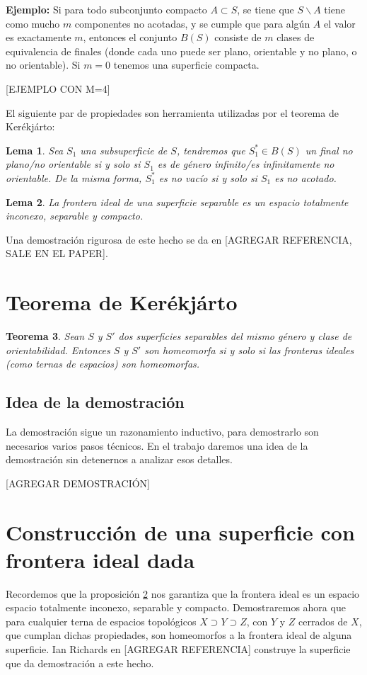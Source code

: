 \documentclass[a4paper,11pt,spanish, twoside, leqno]{tfg-uam}
\newtheorem{teor}{Teorema}[chapter]
\newtheorem{lema}[teor]{Lema}
\theoremstyle{definition}
\begin{document}
\textbf{Ejemplo:} Si para todo subconjunto compacto $A\subset S$, se tiene que $S\backslash A$ tiene como mucho $m$ componentes no acotadas, y se cumple que para algún $A$ el valor es exactamente $m$, entonces el conjunto $B(S)$ consiste de $m$ clases de equivalencia de finales (donde cada uno puede ser plano, orientable y no plano, o no orientable). Si $m=0$ tenemos una superficie compacta.

[EJEMPLO CON M=4]

El siguiente par de propiedades son herramienta utilizadas por el teorema de Kerékjárto:

\begin{lema}
Sea $S_1$ una subsuperficie de $S$, tendremos que $S_1^* \in B(S)$ un final no plano/no orientable si y solo si $S_1$ es de género infinito/es infinitamente no orientable. De la misma forma, $S_1^*$ es no vacío si y solo si $S_1$ es no acotado.
\end{lema}

\begin{lema}
\label{lema:fronteraidealnoconexo}
La frontera ideal de una superficie separable es un espacio totalmente inconexo, separable y compacto.
\end{lema}
Una demostración rigurosa de este hecho se da en [AGREGAR REFERENCIA, SALE EN EL PAPER].

\section{Teorema de Kerékjárto}
\begin{teor}
Sean $S$ y $S'$ dos superficies separables del mismo género y clase de orientabilidad. Entonces $S$ y $S'$ son homeomorfa si y solo si las fronteras ideales (como ternas de espacios) son homeomorfas.
\end{teor}

\subsection{Idea de la demostración}
La demostración sigue un razonamiento inductivo, para demostrarlo son necesarios varios pasos técnicos. En el trabajo daremos una idea de la demostración sin detenernos a analizar esos detalles.

[AGREGAR DEMOSTRACIÓN]

\section{Construcción de una superficie con frontera ideal dada}
Recordemos que la proposición \ref{lema:fronteraidealnoconexo} nos garantiza que la frontera ideal es un espacio espacio totalmente inconexo, separable y compacto. Demostraremos ahora que para cualquier terna de espacios topológicos $X \supset Y \supset Z$, con $Y$ y $Z$ cerrados de $X$, que cumplan dichas propiedades, son homeomorfos a la frontera ideal de alguna superficie. Ian Richards en [AGREGAR REFERENCIA] construye la superficie que da demostración a este hecho. \\
\end{document}
